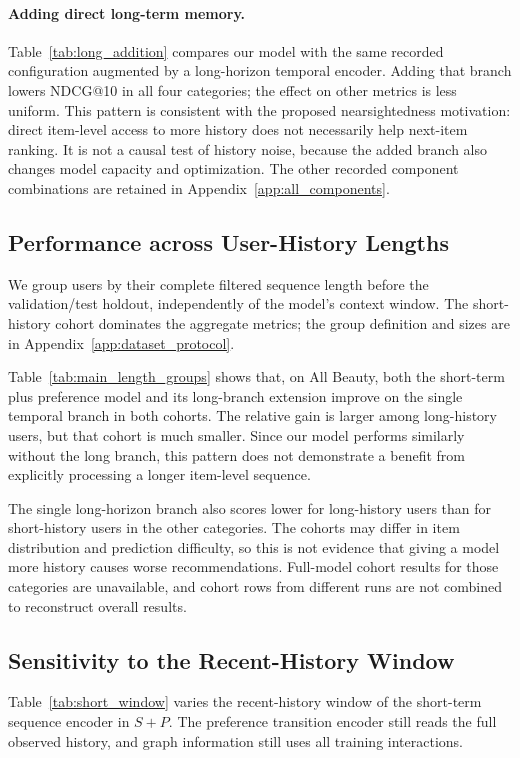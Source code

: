 \documentclass[11pt]{article}
\begin{document}
\paragraph{Adding direct long-term memory.}
Table~\ref{tab:long_addition} compares our model with the same recorded configuration augmented by a long-horizon temporal encoder. Adding that branch lowers NDCG@10 in all four categories; the effect on other metrics is less uniform. This pattern is consistent with the proposed nearsightedness motivation: direct item-level access to more history does not necessarily help next-item ranking. It is not a causal test of history noise, because the added branch also changes model capacity and optimization. The other recorded component combinations are retained in Appendix~\ref{app:all_components}.

\subsection{Performance across User-History Lengths}
We group users by their complete filtered sequence length before the validation/test holdout, independently of the model's context window. The short-history cohort dominates the aggregate metrics; the group definition and sizes are in Appendix~\ref{app:dataset_protocol}.

Table~\ref{tab:main_length_groups} shows that, on All Beauty, both the short-term plus preference model and its long-branch extension improve on the single temporal branch in both cohorts. The relative gain is larger among long-history users, but that cohort is much smaller. Since our model performs similarly without the long branch, this pattern does not demonstrate a benefit from explicitly processing a longer item-level sequence.

The single long-horizon branch also scores lower for long-history users than for short-history users in the other categories. The cohorts may differ in item distribution and prediction difficulty, so this is not evidence that giving a model more history causes worse recommendations. Full-model cohort results for those categories are unavailable, and cohort rows from different runs are not combined to reconstruct overall results.

\subsection{Sensitivity to the Recent-History Window}
Table~\ref{tab:short_window} varies the recent-history window of the short-term sequence encoder in $S+P$. The preference transition encoder still reads the full observed history, and graph information still uses all training interactions.
\end{document}
